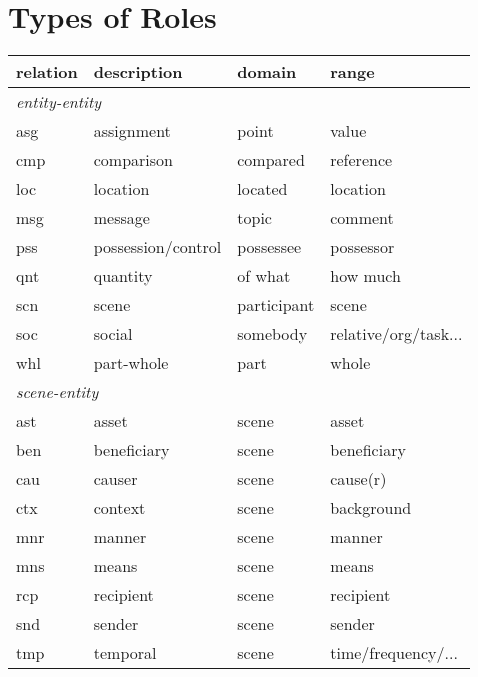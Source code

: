 \documentclass[a4paper]{article}
\begin{document}
\section{Types of Roles}

\begin{table}
    \begin{tabular}{llll}
        \toprule
        \textbf{relation} & \textbf{description} & \textbf{domain} & \textbf{range} \\
        \midrule
        \multicolumn{4}{l}{\emph{entity-entity}} \\
        asg & assignment & point & value \\
        cmp & comparison & compared & reference \\
        loc & location & located & location \\
        msg & message & topic & comment \\
        pss & possession/control & possessee & possessor \\
        qnt & quantity & of what & how much \\
        scn & scene & participant & scene \\
        soc & social & somebody & relative/org/task... \\
        whl & part-whole & part & whole \\
        \midrule
        \multicolumn{4}{l}{\emph{scene-entity}} \\
        ast & asset & scene & asset \\
        ben & beneficiary & scene & beneficiary \\
        cau & causer & scene & cause(r) \\
        ctx & context & scene & background \\
        mnr & manner & scene & manner \\
        mns & means & scene & means \\
        rcp & recipient & scene & recipient \\
        snd & sender & scene & sender \\
        tmp & temporal & scene & time/frequency/... \\

\end{tabular}
\end{table}
\end{document}
